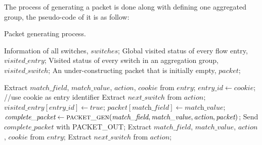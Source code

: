 The process of generating a packet is done along with defining one aggregated group, the pseudo-code of it is as follow:

\begin {tcolorbox}[blanker,float=tbp,
grow to left by=1cm, grow to right by=1cm]
\begin{algorithm}[H]

  \caption{Packet generating process.}
  \begin{algorithmic}[1]
    \Require
      Information of all switches, $switches$;
      Global visited status of every flow entry, $visited\_entry$;  
      Visited status of every switch in an aggregation group, $visited\_switch$;
      An under-constructing packet that is initially empty, $packet$; 

          \State Extract $match\_field$, $match\_value$, $action$, $cookie$ from $entry$;
          \State $entry\_id \gets \textit{cookie}$; //use cookie as entry identifier
          \State 
          \State Extract $next\_switch$ from $action$;
            \State $\textit{visited\_entry}[\textit{entry\_id}] \gets true$;
            \State $packet[\textit{match\_field}] \gets \textit{match\_value}$;
            \State $\textit{complete\_packet} \gets \Call{packet\_gen}{\textit{match\_field}, \textit{match\_value}, \textit{action}, \textit{packet}}$;
            \State Send $\textit{complete\_packet}$ with PACKET\_OUT;
          \EndIf
      \EndFor
        \EndFor
    \EndFunction
    \State
        \State Extract $match\_field$, $match\_value$, $action$, $cookie$ from $entry$;
        \State Extract $next\_switch$ from $action$; 
  \end{algorithmic}
\end{algorithm}
\end{tcolorbox}

